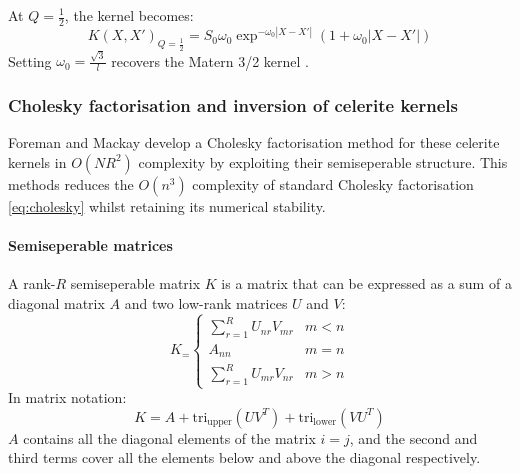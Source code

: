 At $Q = \frac{1}{2}$, the kernel becomes:
\begin{equation*}
    K(X, X')_{Q = \frac{1}{2}} = S_0 \omega_0 \exp^{- \omega_0 |X - X'|} \left( 1 + \omega_0 |X - X'| \right)
\end{equation*}
Setting $\omega_0 = \frac{\sqrt{3}}{l}$ recovers the Matern 3/2 kernel \label{eq:matern-32}.

\subsubsection{Cholesky factorisation and inversion of celerite kernels}
Foreman and Mackay \cite{foreman-mackay} develop a Cholesky factorisation method for these celerite kernels in $O(NR^2)$ complexity by exploiting their semiseperable structure. This methods reduces the $O(n^3)$ complexity of standard Cholesky factorisation \ref{eq:cholesky} whilst retaining its numerical stability.

\paragraph{Semiseperable matrices}
A rank-$R$ semiseperable matrix $K$ is a matrix that can be expressed as a sum of a diagonal matrix $A$ and two low-rank matrices $U$ and $V$:
\begin{equation} \label{eq:semiseperable-cases}
    K_ = \begin{cases}
        \sum_{r=1}^R U_{nr} V_{mr} & m < n \\
        A_{nn} & m = n \\
        \sum_{r=1}^R U_{mr} V_{nr} & m > n
    \end{cases}
\end{equation}
In matrix notation:
\begin{equation} \label{eq:semiseperable-matrix}
    K = A + \text{tri}_{\text{upper}}(U V^T) + \text{tri}_{\text{lower}}(V U^T)
\end{equation}
$A$ contains all the diagonal elements of the matrix $i = j$, and the second and third terms cover all the elements below and above the diagonal respectively.

